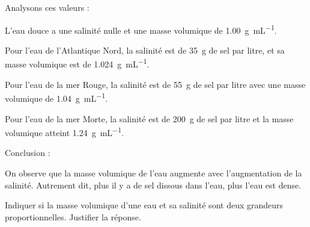\documentclass[answers]{exam}
\begin{document}
\begin{questions}
\begin{solution}
Analysons ces valeurs :

\begin{compactitem}
    \item L'eau douce a une salinité nulle et une masse volumique de \SI{1.00}{\gram\per\milli\liter}.
    \item Pour l'eau de l'Atlantique Nord, la salinité est de \SI{35}{\gram} de sel par litre, et sa masse volumique est de \SI{1.024}{\gram\per\milli\liter}.
    \item Pour l'eau de la mer Rouge, la salinité est de \SI{55}{\gram} de sel par litre avec une masse volumique de \SI{1.04}{\gram\per\milli\liter}.
    \item Pour l'eau de la mer Morte, la salinité est de \SI{200}{\gram} de sel par litre et la masse volumique atteint \SI{1.24}{\gram\per\milli\liter}.
\end{compactitem}

Conclusion :

On observe que la masse volumique de l'eau augmente avec l'augmentation de la salinité. Autrement dit, plus il y a de sel dissous dans l'eau, plus l'eau est dense.
\end{solution}

\question[2] Indiquer si la masse volumique d’une eau et sa salinité sont deux grandeurs proportionnelles. Justifier la réponse.


  \end{questions}
\end{document}
